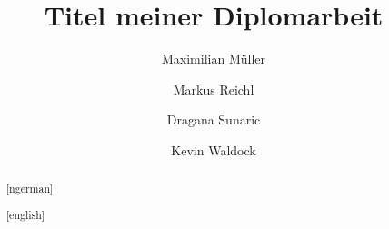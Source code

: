 \documentclass[minted]{thesis}
\title{Titel meiner Diplomarbeit}
\author{Maximilian Müller \and Markus Reichl \and Dragana Sunaric \and Kevin Waldock}
\begin{document}
\begin{abstract}[ngerman]

\end{abstract}
\begin{abstract}[english]

\end{abstract}
\tableofcontents\glsresetall
\pagestyle{fancy}







\end{document}
